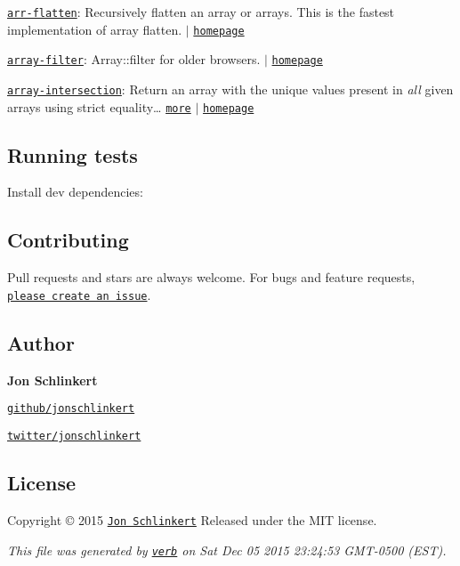 \begin{DoxyItemize}
\item \href{https://www.npmjs.com/package/arr-flatten}{\tt arr-\/flatten}\+: Recursively flatten an array or arrays. This is the fastest implementation of array flatten. $\vert$ \href{https://github.com/jonschlinkert/arr-flatten}{\tt homepage}
\item \href{https://www.npmjs.com/package/array-filter}{\tt array-\/filter}\+: Array\+::filter for older browsers. $\vert$ \href{https://github.com/juliangruber/array-filter}{\tt homepage}
\item \href{https://www.npmjs.com/package/array-intersection}{\tt array-\/intersection}\+: Return an array with the unique values present in {\itshape all} given arrays using strict equality… \href{https://www.npmjs.com/package/array-intersection}{\tt more} $\vert$ \href{https://github.com/jonschlinkert/array-intersection}{\tt homepage}
\end{DoxyItemize}

\subsection*{Running tests}

Install dev dependencies\+:




\subsection*{Contributing}

Pull requests and stars are always welcome. For bugs and feature requests, \href{https://github.com/jonschlinkert/arr-diff/issues/new}{\tt please create an issue}.

\subsection*{Author}

{\bfseries Jon Schlinkert}


\begin{DoxyItemize}
\item \href{https://github.com/jonschlinkert}{\tt github/jonschlinkert}
\item \href{http://twitter.com/jonschlinkert}{\tt twitter/jonschlinkert}
\end{DoxyItemize}

\subsection*{License}

Copyright © 2015 \href{https://github.com/jonschlinkert}{\tt Jon Schlinkert} Released under the M\+IT license.





{\itshape This file was generated by \href{https://github.com/verbose/verb}{\tt verb} on Sat Dec 05 2015 23\+:24\+:53 G\+M\+T-\/0500 (E\+ST).} 